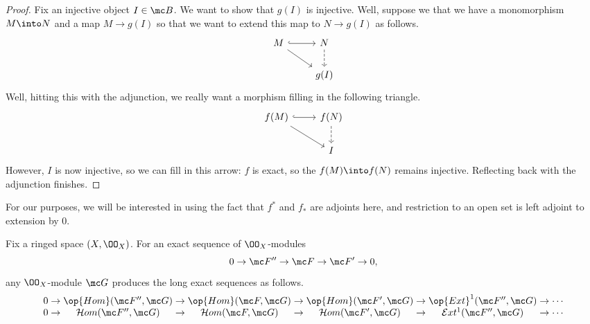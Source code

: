 \documentclass[../notes.tex]{subfiles}
\begin{document}
\begin{proof}
	Fix an injective object $I\in\mc B$. We want to show that $g(I)$ is injective. Well, suppose we that we have a monomorphism $M\into N$ and a map $M\to g(I)$ so that we want to extend this map to $N\to g(I)$ as follows.
	\[\begin{tikzcd}
		M & N \\
		& {g(I)}
		\arrow[from=1-1, to=2-2]
		\arrow[hook, from=1-1, to=1-2]
		\arrow[dashed, from=1-2, to=2-2]
	\end{tikzcd}\]
	Well, hitting this with the adjunction, we really want a morphism filling in the following triangle.
	\[\begin{tikzcd}
		{f(M)} & {f(N)} \\
		& I
		\arrow[from=1-1, to=2-2]
		\arrow[hook, from=1-1, to=1-2]
		\arrow[dashed, from=1-2, to=2-2]
	\end{tikzcd}\]
	However, $I$ is now injective, so we can fill in this arrow: $f$ is exact, so the $f(M)\into f(N)$ remains injective. Reflecting back with the adjunction finishes.
\end{proof}
For our purposes, we will be interested in using the fact that $f^*$ and $f_*$ are adjoints here, and restriction to an open set is left adjoint to extension by $0$.
\begin{proposition} \label{prop:contravariant-ext-les}
	Fix a ringed space $(X,\OO_X)$. For an exact sequence of $\OO_X$-modules
	\[0\to\mc F''\to\mc F\to\mc F'\to0,\]
	any $\OO_X$-module $\mc G$ produces the long exact sequences as follows.
	\[\arraycolsep=1.4pt\begin{array}{ccccccccccccccc}
		0 &\to& \op{Hom}(\mc F'',\mc G) &\to& \op{Hom}(\mc F,\mc G) &\to& \op{Hom}(\mc F',\mc G) &\to& \op{Ext}^1(\mc F'',\mc G) &\to& \cdots \\
		0 &\to& \mathcal Hom(\mc F'',\mc G) &\to& \mathcal Hom(\mc F,\mc G) &\to& \mathcal Hom(\mc F',\mc G) &\to& \mathcal Ext^1(\mc F'',\mc G) &\to& \cdots \\
	\end{array}\]
\end{proposition}
\end{document}
